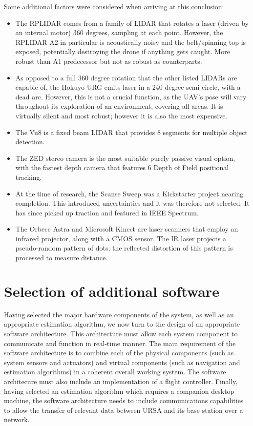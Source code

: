 \documentclass[capstone_report.tex]{subfiles}
\begin{document}
Some additional factors were considered when arriving at this conclusion:
\begin{itemize}
\item The RPLIDAR comes from a family of LIDAR that rotates a laser (driven by an internal motor) 360 degrees, sampling at each point. However, the RPLIDAR A2 in particular is acoustically noisy and the belt/spinning top is exposed, potentially destroying the drone if anything gets caught. More robust than A1 predecessor but not as robust as counterparts.
\item As opposed to a full 360 degree rotation that the other listed LIDARs are capable of, the Hokuyo URG emits laser in a 240 degree semi-circle, with a dead arc. However, this is not a crucial function, as the UAV’s pose will vary throughout its exploration of an environment, covering all areas. It is virtually silent and most robust; however it is also the most expensive.
\item The Vu8 is a fixed beam LIDAR that provides 8 segments for multiple object detection.
\item The ZED stereo camera is the most suitable purely passive visual option, with the fastest depth camera that features 6 Depth of Field positional tracking.
\item At the time of research, the Scanse Sweep was a Kickstarter project nearing completion. This introduced uncertainties and it was therefore not selected. It has since picked up traction and featured in IEEE Spectrum\cite{scanse}.
\item The Orbecc Astra and Microsoft Kinect are laser scanners that employ an infrared projector, along with a CMOS sensor. The IR laser projects a pseudo-random pattern of dots; the reflected distortion of this pattern is processed to measure distance.
\end{itemize}

\section{Selection of additional software}
Having selected the major hardware components of the system, as well as an appropriate estimation algorithm, we now turn to the design of an appropriate software architecture. This architecture must allow each system component to communicate and function in real-time manner. The main requirement of the software architecture is to combine each of the physical components (such as system sensors and actuators) and virtual components (such as navigation and estimation algorithms) in a coherent overall working system. The software architecure must also include an implementation of a flight controller. Finally, having selected an estimation algorithm which requires a companion desktop machine, the software architecture needs to include communications capabilities to allow the transfer of relevant data between URSA and its base station over a network.\\
\end{document}
